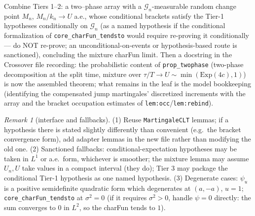\documentclass[11pt]{article}
\theoremstyle{plain}
\theoremstyle{remark}
\newtheorem{remark}{Remark}
\begin{document}
Combine Tiers 1--2: a two--phase array with a $\mathcal G_n$-measurable random
change point $M_n$, $M_n/k_n\to U$ a.e., whose conditional brackets satisfy the
Tier-1 hypotheses conditionally on $\mathcal G_n$ (as a named hypothesis if the
conditional formalization of \texttt{core\_charFun\_tendsto} would require
re-proving it conditionally --- do NOT re-prove; an unconditional-on-events or
hypothesis-based route is sanctioned), concluding the mixture charFun limit.
Then a docstring in the Crossover file recording: the probabilistic content of
\texttt{prop\_twophase} (two-phase decomposition at the split time, mixture
over $\tau/T\to U\sim\min(\mathrm{Exp}(4c),1)$) is now the assembled theorem;
what remains in the leaf is the model bookkeeping (identifying the compensated
jump martingales' discretized increments with the array and the bracket
occupation estimates of \texttt{lem:occ}/\texttt{lem:rebind}).

\begin{remark}[interface and fallbacks]
(1) Reuse \texttt{MartingaleCLT} lemmas; if a hypothesis there is stated
slightly differently than convenient (e.g.\ the bracket convergence form),
add adapter lemmas in the new file rather than modifying the old one.
(2) Sanctioned fallbacks: conditional-expectation hypotheses may be taken in
$L^1$ or a.e.\ form, whichever is smoother; the mixture lemma may assume $U_n,U$
take values in a compact interval (they do); Tier 3 may package the conditional
Tier-1 hypothesis as one named hypothesis.
(3) Degenerate cases: $\psi_u$ is a positive semidefinite quadratic form which
degenerates at $(a,-a)$, $u=1$; \texttt{core\_charFun\_tendsto} at
$\sigma^2=0$ (if it requires $\sigma^2>0$, handle $\psi=0$ directly: the sum
converges to $0$ in $L^2$, so the charFun tends to $1$).
\end{remark}
\end{document}
